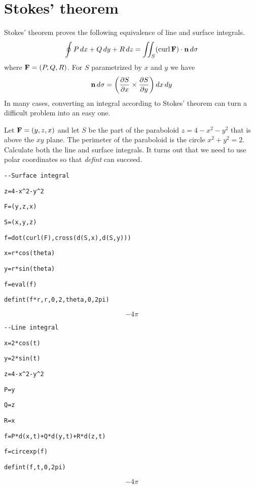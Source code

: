 \section*{Stokes' theorem}
Stokes' theorem proves the following equivalence of line and surface
integrals.
%
$$\oint P\,dx+Q\,dy+R\,dz
=\int\!\!\!\int_S(\mathop{\rm curl}{\bf F})\cdot{\bf n}\,d\sigma
$$
where ${\bf F}=(P,Q,R)$.
For $S$ parametrized by $x$ and $y$ we have
$${\bf n}\,d\sigma=\left(
{\partial S\over\partial x}\times{\partial S\over\partial y}
\right)dx\,dy$$
In many cases, converting an integral according to
Stokes' theorem can turn a difficult problem into an easy one.

\medskip
\noindent
Let ${\bf F}=(y,z,x)$ and let $S$ be the part of the paraboloid
$z=4-x^2-y^2$
that is above the $xy$ plane.
The perimeter of the paraboloid is the circle $x^2+y^2=2$.
Calculate both the line and surface integrals.
It turns out that we need to use polar coordinates so that {\it defint} can
succeed.

\medskip
\verb$--Surface integral$

\verb$z=4-x^2-y^2$

\verb$F=(y,z,x)$

\verb$S=(x,y,z)$

\verb$f=dot(curl(F),cross(d(S,x),d(S,y)))$

\verb$x=r*cos(theta)$

\verb$y=r*sin(theta)$

\verb$f=eval(f)$

\verb$defint(f*r,r,0,2,theta,0,2pi)$

$$-4\pi$$

\verb$--Line integral$

\verb$x=2*cos(t)$

\verb$y=2*sin(t)$

\verb$z=4-x^2-y^2$

\verb$P=y$

\verb$Q=z$

\verb$R=x$

\verb$f=P*d(x,t)+Q*d(y,t)+R*d(z,t)$

\verb$f=circexp(f)$

\verb$defint(f,t,0,2pi)$

$$-4\pi$$


